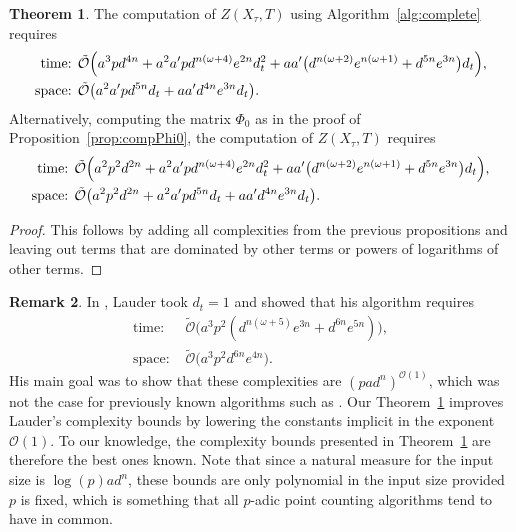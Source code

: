 \documentclass[a4paper,11pt]{article}
\numberwithin{equation}{section}
\providecommand{\BigOh}{\mathcal{O}}          %
\providecommand{\SoftOh}{\tilde{\mathcal{O}}} %
\theoremstyle{definition}
\newtheorem{thm}{Theorem}[section]
\newtheorem{rem}[thm]{Remark}
\begin{document}
\begin{thm} \label{thm:totalcomplexity}
The computation of $Z(X_{\tau},T)$ using Algorithm~\ref{alg:complete} requires
\begin{align*}
\mbox{time: }  &\SoftOh\Bigl( 
                a^3 p d^{4n} + 
                a^2 a' p d^{n(\omega+4)} e^{2n} d_t^2+
                aa' \bigl(d^{n(\omega+2)} e^{n(\omega+1)}+ d^{5n} e^{3n}\bigr) d_t 
                \Bigr), \\
\mbox{space: } &\SoftOh\bigl( a^2 a' p d^{5n} d_t + a a' d^{4n} e^{3n} d_t \bigr).
\end{align*}
Alternatively, computing the matrix $\Phi_0$ as in the proof of Proposition~\ref{prop:compPhi0}, 
the computation of $Z(X_{\tau},T)$ requires
\begin{align*}
\mbox{time: }  &\SoftOh\Bigl( 
                a^2 p^2 d^{2n} + 
                a^2 a' p d^{n(\omega+4)} e^{2n} d_t^2+
                aa' \bigl(d^{n(\omega+2)} e^{n(\omega+1)}+ d^{5n} e^{3n}\bigr) d_t 
                \Bigr), \\
\mbox{space: } &\SoftOh\bigl( 
                a^2 p^2 d^{2n} + 
                a^2 a' p d^{5n} d_t + 
                a a' d^{4n} e^{3n} d_t \bigr).
\end{align*}
\end{thm}

\begin{proof}
This follows by adding all complexities from the previous propositions and 
leaving out terms that are dominated by other terms or powers of
logarithms of other terms.
\end{proof}

\begin{rem} In \citep{Lauder2004a}, Lauder took $d_t=1$ and showed that his
algorithm requires
\begin{align*}
\mbox{time: }  &\SoftOh\bigl(a^3 p^2 (d^{n(\omega+5)} e^{3n} + d^{6n} e^{5n}) \bigr), \\ 
\mbox{space: } &\SoftOh\bigl(a^3 p^2 d^{6n} e^{4n} \bigr).
\end{align*}
His main goal was to show that these complexities are $(pad^n)^{\BigOh(1)}$, 
which was not the case for previously known algorithms such as 
\citep{AbbottKedlayaRoe2006, LauderWan2008}. 
Our Theorem~\ref{thm:totalcomplexity} improves Lauder's complexity bounds 
by lowering the constants implicit in the exponent~$\BigOh(1)$.  To our 
knowledge, the complexity bounds presented in Theorem~\ref{thm:totalcomplexity} 
are therefore the best ones known.  Note that since a natural measure for the 
input size is $\log(p) a d^n$, these bounds are only polynomial in the 
input size provided $p$ is fixed, which is something that all $p$-adic 
point counting algorithms tend to have in common.
\end{rem}
\end{document}
